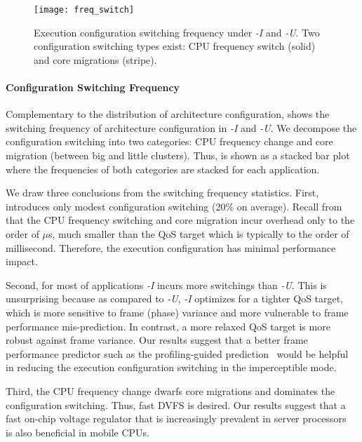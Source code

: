 \begin{figure}[t]
  \centering
  \texttt{[image: freq\_switch]}
  \caption{Execution configuration switching frequency under \textit{\ebs-I} and \textit{\ebs-U}. Two configuration switching types exist: CPU frequency switch (solid) and core migrations (stripe).}
  \label{fig:freq_switch}
\end{figure}

\paragraph{Configuration Switching Frequency} Complementary to the distribution of architecture configuration,  shows the switching frequency of architecture configuration in \textit{\ebs-I} and \textit{\ebs-U}. We decompose the configuration switching into two categories: CPU frequency change and core migration (between big and little clusters). Thus,  is shown as a stacked bar plot where the frequencies of both categories are stacked for each application.

We draw three conclusions from the switching frequency statistics. First, \ebs introduces only modest configuration switching (20\% on average). Recall from  that the CPU frequency switching and core migration incur overhead only to the order of $\mu$s, much smaller than the QoS target which is typically to the order of millisecond. Therefore, the execution configuration has minimal performance impact.

Second, for most of applications \textit{\ebs-I} incurs more switchings than \textit{\ebs-U}. This is unsurprising because as compared to \textit{\ebs-U}, \textit{\ebs-I} optimizes for a tighter QoS target, which is more sensitive to frame (phase) variance and more vulnerable to frame performance mis-prediction. In contrast, a more relaxed QoS target is more robust against frame variance. Our results suggest that a better frame performance predictor such as the profiling-guided prediction~\cite{pgdvfs} would be helpful in reducing the execution configuration switching in the imperceptible mode.

Third, the CPU frequency change dwarfs core migrations and dominates the configuration switching. Thus, fast DVFS is desired. Our results suggest that a fast on-chip voltage regulator that is increasingly prevalent in server processors~\cite{fivr,ivr} is also beneficial in mobile CPUs.

